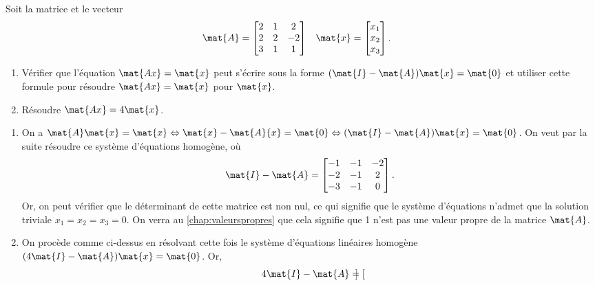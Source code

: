 \begin{exercice}
  Soit la matrice et le vecteur
  \begin{align*}
    \mat{A}
    &=
    \begin{bmatrix}
      2 & 1 & 2 \\ 2 & 2 & -2 \\ 3 & 1 & 1
    \end{bmatrix} &
    \mat{x}
    &=
    \begin{bmatrix}
      x_1 \\ x_2 \\ x_3
    \end{bmatrix}.
  \end{align*}
  \begin{enumerate}
  \item Vérifier que l'équation $\mat{Ax} = \mat{x}$ peut s'écrire
    sous la forme $(\mat{I} - \mat{A}) \mat{x} = \mat{0}$ et utiliser
    cette formule pour résoudre $\mat{Ax} = \mat{x}$ pour $\mat{x}$.
  \item Résoudre $\mat{Ax} = 4 \mat{x}$.
  \end{enumerate}
  \begin{sol}
    \begin{enumerate}
    \item On a $\mat{A}\mat{x} = \mat{x} \Leftrightarrow \mat{x} -
      \mat{A}{x} = \mat{0} \Leftrightarrow (\mat{I} - \mat{A}) \mat{x}
      = \mat{0}$. On veut par la suite résoudre ce système d'équations
      homogène, où
      \begin{displaymath}
        \mat{I} - \mat{A} =
        \begin{bmatrix}
          -1 & -1 & -2 \\ -2 & -1 & 2 \\ -3 & -1 & 0
        \end{bmatrix}.
      \end{displaymath}
      Or, on peut vérifier que le déterminant de cette matrice est non
      nul, ce qui signifie que le système d'équations n'admet que la
      solution triviale $x_1 = x_2 = x_3 = 0$. On verra au
      \autoref{chap:valeurspropres} que cela signifie que 1 n'est pas
      une valeur propre de la matrice $\mat{A}$.
    \item On procède comme ci-dessus en résolvant cette fois le
      système d'équations linéaires homogène $(4\mat{I} - \mat{A})
      \mat{x} = \mat{0}$. Or,
      \begin{displaymath}
        4 \mat{I} - \mat{A} =
        \begin{bmatrix}

\end{bmatrix}
\end{displaymath}
\end{enumerate}
\end{sol}
\end{exercice}
